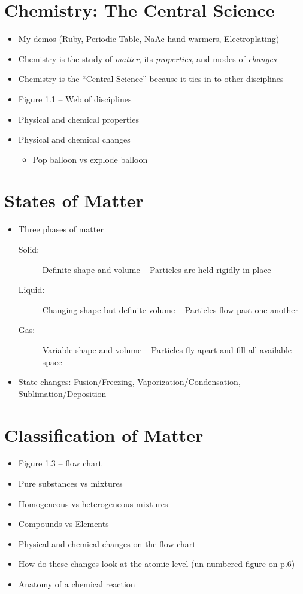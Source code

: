 \documentclass[12pt, openany, letterpaper]{memoir}
\begin{document}
\section{Chemistry: The Central Science}
\begin{itemize}
	\item My demos (Ruby, Periodic Table, NaAc hand warmers, Electroplating)
	\item Chemistry is the study of \emph{matter}, its \emph{properties}, and modes of \emph{changes}
	\item Chemistry is the ``Central Science'' because it ties in to other disciplines
	\item Figure 1.1 -- Web of disciplines
	\item Physical and chemical properties
	\item Physical and chemical changes
	      \begin{itemize}
		      \item Pop balloon vs explode balloon
	      \end{itemize}
\end{itemize}

\section{States of Matter}
\begin{itemize}
	\item Three phases of matter
	      \begin{description}
		      \item[Solid:] Definite shape and volume -- Particles are held rigidly in place
		      \item[Liquid:] Changing shape but definite volume -- Particles flow past one another
		      \item[Gas:] Variable shape and volume -- Particles fly apart and fill all available space
	      \end{description}
	\item State changes: Fusion/Freezing, Vaporization/Condensation, Sublimation/Deposition
\end{itemize}

\section{Classification of Matter}
\begin{itemize}
	\item Figure 1.3 -- flow chart
	\item Pure substances vs mixtures
	\item Homogeneous vs heterogeneous mixtures
	\item Compounds vs Elements
	\item Physical and chemical changes on the flow chart
	\item How do these changes look at the atomic level (un-numbered figure on p.6)
	\item Anatomy of a chemical reaction
\end{itemize}
\end{document}
